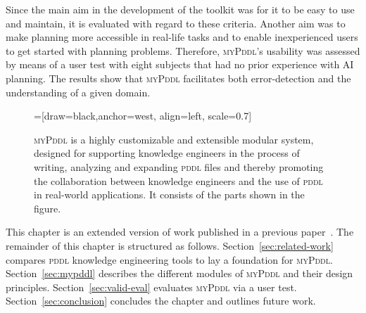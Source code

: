 \documentclass[runningheads]{llncs}
\newcommand{\mypddl}{\textsc{myPddl}\xspace}
\newcommand{\pddl}{\textsc{pddl}\xspace}
\begin{document}
Since the main aim in the development of the toolkit was for it to be
easy to use and maintain, it is evaluated with regard to these
criteria. Another aim was to make planning more accessible in
real-life tasks and to enable inexperienced users to get started with
planning problems. Therefore, \mypddl's usability was assessed by
means of a user test with eight subjects that had no prior experience
with AI planning. The results show that \mypddl facilitates both
error-detection and the understanding of a given domain.

\begin{figure}[H]
  \centering
  =[draw=black,anchor=west,
  align=left,
  scale=0.7]
    \caption{\mypddl is a highly customizable and extensible modular
    system, designed for supporting knowledge engineers in the process
    of writing, analyzing and expanding \pddl files and thereby
    promoting the collaboration between knowledge engineers and the
    use of \pddl in real-world applications. It consists of the parts
    shown in the figure.}
  \label{fig:mypddl-overview}  
\end{figure}

This chapter is an extended version of work published in a previous
paper~\cite{StrKir2014:aai}. The remainder of this chapter is
structured as follows. Section~\ref{sec:related-work} compares \pddl
knowledge engineering tools to lay a foundation for
\mypddl. Section~\ref{sec:mypddl} describes the different modules of
\mypddl and their design principles. Section~\ref{sec:valid-eval}
evaluates \mypddl via a user test. Section~\ref{sec:conclusion}
concludes the chapter and outlines future work.
\end{document}
